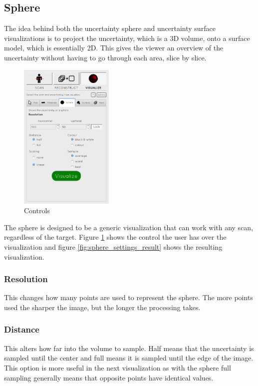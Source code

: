 \clearpage
\subsection{Sphere}\label{implementation:sphere}
The idea behind both the uncertainty sphere and uncertainty surface visualizations is to project the uncertainty, which is a 3D volume, onto a surface model, which is essentially 2D. This gives the viewer an overview of the uncertainty without having to go through each area, slice by slice.

\begin{figure}
  \vspace{-20pt}
  \includegraphics[width=0.4\textwidth]{images/tool/3_sphere.png}
  \caption{Controls}\label{fig:sphere_settings}
\end{figure}

The sphere is designed to be a generic visualization that can work with any scan, regardless of the target. Figure \ref{fig:sphere_settings} shows the control the user has over the visualization and figure \ref{fig:sphere_settings_result} shows the resulting visualization.

\subsubsection{Resolution}
This changes how many points are used to represent the sphere. The more points used the sharper the image, but the longer the processing takes.

\subsubsection{Distance}
This alters how far into the volume to sample. Half means that the uncertainty is sampled until the center and full means it is sampled until the edge of the image. This option is more useful in the next visualization as with the sphere full sampling generally means that opposite points have identical values.

